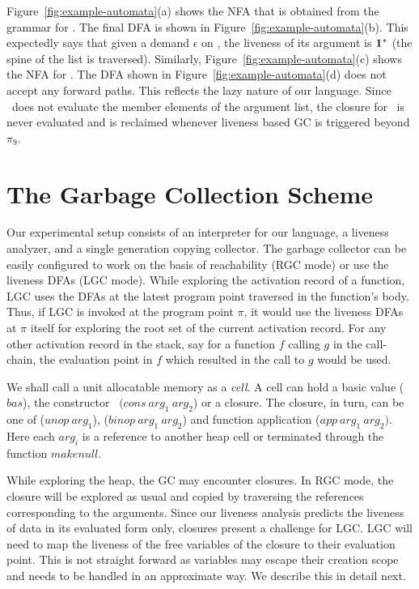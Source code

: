 \documentclass[9pt]{sigplanconf}
\begin{document}
Figure~\ref{fig:example-automata}(a)  shows the  NFA that  is obtained
from the grammar for .  The final DFA is shown in
Figure~\ref{fig:example-automata}(b).  This expectedly says that given
a  demand $\epsilon$  on  \length,  the liveness  of  its argument  is
$\mathbf{1}^{*}$  (the  spine  of   the  list  is  traversed).   Similarly,
Figure~\ref{fig:example-automata}(c)     shows     the     NFA     for
.          The         DFA         shown         in
Figure~\ref{fig:example-automata}(d)  does  not   accept  any  forward
paths.   This  reflects  the  lazy  nature  of  our  language.   Since
\length\ does not  evaluate the member elements of  the argument list,
the  closure for  \pa\ is  never evaluated  and is  reclaimed whenever
liveness based GC is triggered beyond $\pi_9$.


\section{The Garbage Collection Scheme}

Our experimental setup consists of  an interpreter for our language, a
liveness  analyzer, and  a single  generation copying  collector.  The
garbage collector  can be  easily configured to  work on the  basis of
reachability (RGC  mode) or use  the liveness DFAs (LGC  mode).  While
exploring the  activation record of a  function, LGC uses  the DFAs at
the latest program  point traversed in the function's  body.  Thus, if
LGC is invoked  at the program point $\pi$, it  would use the liveness
DFAs  at  $\pi$ itself  for  exploring the  root  set  of the  current
activation record. For  any other activation record in  the stack, say
for a function ${\mathit f}$  calling ${\mathit g}$ in the call-chain,
the evaluation  point in ${\mathit f}$  which resulted in  the call to
${\mathit g}$ would be used.

We shall call  a unit allocatable memory as a {\em  cell}.  A cell can
hold  a  basic  value   ($\mathit{bas}$),  the  constructor  \CONS\  $(\mathit{cons~
arg_1~arg_2}$) or   a closure.  The closure, in  turn, can be  one of
($\mathit{unop~arg_1}$),  ($\mathit{ binop~arg_1~arg_2}$)  and  function  application
($\mathit{app~arg_1~arg_2})$.  Here each $\mathit{ arg_i}$ is a reference to another heap
cell or terminated through the function $\mathit{makenull}$.

While exploring the heap, the GC  may encounter closures. In RGC mode,
the closure  will be explored  as usual  and copied by  traversing the
references corresponding to the arguments. Since our liveness analysis
predicts the  liveness of  data in its  evaluated form  only, closures
present a challenge for LGC. LGC will  need to map the liveness of the
free variables of the closure to  their evaluation point.  This is not
straight  forward as  variables may  escape their  creation scope  and
needs to  be handled in an  approximate way.  We describe this in detail next.
\end{document}
